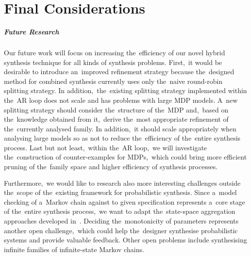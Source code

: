 \chapter{Final Considerations}\label{chap:conclusion}

\paragraph{Future Research}
Our future work will focus on increasing the~efficiency of our novel hybrid synthesis technique for all kinds of synthesis problems.
First,~it would be desirable to introduce an~improved refinement strategy because the~designed method for combined synthesis currently uses only the~naive round-robin splitting strategy.
In addition,~the~existing splitting strategy implemented within the~AR loop does not scale and has problems with large MDP models.
A~new splitting strategy should consider the~structure of the~MDP and,~based on the~knowledge obtained from it,~derive the~most appropriate refinement of the~currently analysed family.
In addition,~it should scale appropriately when analysing large models so as not to reduce the~efficiency of the~entire synthesis process.
Last but not least,~within the~AR loop,~we will investigate the~construction of counter-examples for MDPs,~which could bring more efficient pruning of the~family space and higher efficiency of synthesis processes.

Furthermore,~we would like to research also more interesting challenges outside the~scope of the~existing framework for probabilistic synthesis.
Since a~model checking of a~Markov chain against to given specification represents a~core stage of the~entire synthesis process,~we want to adapt the~state-space aggregation approaches developed in~\cite{roman-DP}.
Deciding the~monotonicity of parameters represents another open challenge,~which could help the~designer synthesise probabilistic systems and provide valuable feedback.
Other open problems include synthesising infinite families of infinite-state Markov chains.

